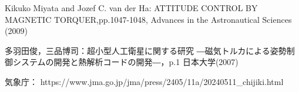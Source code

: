 \begin{thebibliography}{99}
	Kikuko Miyata and Jozef C. van der Ha:
	ATTITUDE CONTROL BY MAGNETIC TORQUER,pp.1047-1048,
	Advances in the Astronautical Sciences (2009)

	多羽田俊，三品博司：超小型人工衛星に関する研究
	―磁気トルカによる姿勢制御システムの開発と熱解析コードの開発―，p.1
	日本大学(2007)

	気象庁：
	https://www.jma.go.jp/jma/press/2405/11a/20240511\_chijiki.html
	
\end{thebibliography}
